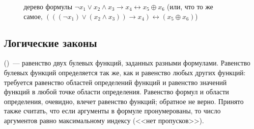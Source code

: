 \begin{figure}[ht!]
    \center
    \caption{дерево формулы $ \neg x_1 \vee x_2 \wedge x_3 \rightarrow x_4 \leftrightarrow x_5 \oplus x_6 $
    (или, что то же самое, $ (((\neg x_1) \vee (x_2 \wedge x_3)) \rightarrow x_4) \leftrightarrow (x_5 \oplus x_6) $)}
    \label{fig:boolean:tree_example}
\end{figure}

\FloatBarrier



\subsection{Логические законы}
\label{subsec:boolean:laws}



 ()~--- равенство двух булевых функций, заданных разными формулами.
Равенство булевых функций определяется так же, как и равенство любых других функций:
требуется равенство областей определений функций и равенство значений функций в любой точке области определения.
Равенство формул и области определения, очевидно, влечет равенство функций; обратное не верно.
Принято также считать, что если аргументы в формуле пронумерованы, то число аргументов равно максимальному индексу (<<нет пропусков>>).

